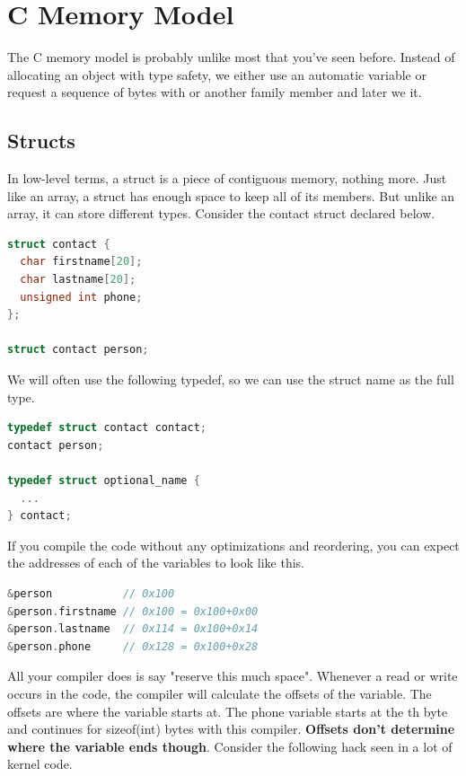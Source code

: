 \section{C Memory Model}

The C memory model is probably unlike most that you've seen before. Instead of allocating an object with type safety, we either use an automatic variable or request a sequence of bytes with  or another family member and later we  it.

\subsection{Structs}

In low-level terms, a struct is a piece of contiguous memory, nothing more.
Just like an array, a struct has enough space to keep all of its members.
But unlike an array, it can store different types. Consider the contact struct declared below.

\begin{lstlisting}[language=C]
struct contact {
  char firstname[20];
  char lastname[20];
  unsigned int phone;
};

struct contact person;
\end{lstlisting}

We will often use the following typedef, so we can use the struct name as the full type.

\begin{lstlisting}[language=C]
typedef struct contact contact;
contact person;

typedef struct optional_name {
  ...
} contact;
\end{lstlisting}

If you compile the code without any optimizations and reordering, you can expect the addresses of each of the variables to look like this.

\begin{lstlisting}[language=C]
&person           // 0x100
&person.firstname // 0x100 = 0x100+0x00
&person.lastname  // 0x114 = 0x100+0x14
&person.phone     // 0x128 = 0x100+0x28
\end{lstlisting}

All your compiler does is say "reserve this much space".
Whenever a read or write occurs in the code, the compiler will calculate the offsets of the variable.
The offsets are where the variable starts at.
The phone variable starts at the th byte and continues for sizeof(int) bytes with this compiler.
\textbf{Offsets don't determine where the variable ends though}.
Consider the following hack seen in a lot of kernel code.

